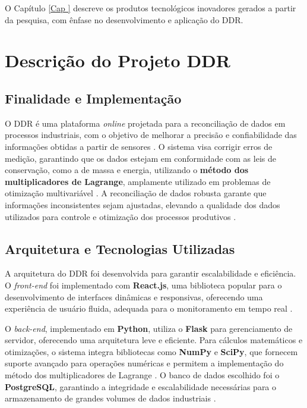  \label{Cap
}

O Capítulo \ref{Cap
} descreve os produtos tecnológicos inovadores gerados a partir da pesquisa, com ênfase no desenvolvimento e aplicação do DDR.

\section{Descrição do Projeto DDR}

\subsection{Finalidade e Implementação}

O DDR é uma plataforma \textit{online} projetada para a reconciliação de dados em processos industriais, com o objetivo de melhorar a precisão e confiabilidade das informações obtidas a partir de sensores \cite{datarecshakar}. O sistema visa corrigir erros de medição, garantindo que os dados estejam em conformidade com as leis de conservação, como a de massa e energia, utilizando o \textbf{método dos multiplicadores de Lagrange}, amplamente utilizado em problemas de otimização multivariável \cite{optimizationlagrange}. A reconciliação de dados robusta garante que informações inconsistentes sejam ajustadas, elevando a qualidade dos dados utilizados para controle e otimização dos processos produtivos \cite{datarecragnoli}.

\subsection{Arquitetura e Tecnologias Utilizadas}

A arquitetura do DDR foi desenvolvida para garantir escalabilidade e eficiência. O \textit{front-end} foi implementado com \textbf{React.js}, uma biblioteca popular para o desenvolvimento de interfaces dinâmicas e responsivas, oferecendo uma experiência de usuário fluida, adequada para o monitoramento em tempo real \cite{reactjs}.

O \textit{back-end}, implementado em \textbf{Python}, utiliza o \textbf{Flask} para gerenciamento de servidor, oferecendo uma arquitetura leve e eficiente. Para cálculos matemáticos e otimizações, o sistema integra bibliotecas como \textbf{NumPy} e \textbf{SciPy}, que fornecem suporte avançado para operações numéricas e permitem a implementação do método dos multiplicadores de Lagrange \cite{lagrangehistory}. O banco de dados escolhido foi o \textbf{PostgreSQL}, garantindo a integridade e escalabilidade necessárias para o armazenamento de grandes volumes de dados industriais \cite{databasesqlmaster}.

